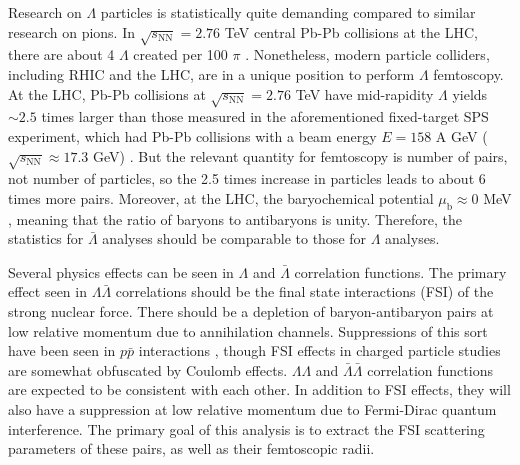 Research on $\Lambda$ particles is statistically quite demanding compared to similar research on pions.
In $\sqrt{s_{\mathrm{NN}}}=2.76$ TeV central Pb-Pb collisions at the LHC, there are about 4 $\Lambda$ created per 100 $\pi$ \cite{Zhang:2013fta}.
Nonetheless, modern particle colliders, including RHIC and the LHC, are in a unique position to perform $\Lambda$ femtoscopy.
At the LHC, Pb-Pb collisions at $\sqrt{s_{\mathrm{NN}}}=2.76$ TeV have mid-rapidity $\Lambda$ yields $\sim 2.5$ times larger than those measured in the aforementioned fixed-target SPS experiment, which had Pb-Pb collisions with a beam energy $E = 158$ A GeV ($\sqrt{s_{\mathrm{NN}}} \approx 17.3$ GeV)  \cite{Abelev:2013xaa,Alt:2008qm}.
But the relevant quantity for femtoscopy is number of pairs, not number of particles, so the 2.5 times increase in particles leads to about 6 times more pairs. 
Moreover, at the LHC, the baryochemical potential $\mu_\mathrm{b} \approx 0$ MeV \cite{Stachel:2013zma}, meaning that the ratio of baryons to antibaryons is unity.
Therefore, the statistics for $\bar{\Lambda}$ analyses should be comparable to those for $\Lambda$ analyses.





Several physics effects can be seen in $\Lambda$ and $\bar{\Lambda}$ correlation functions.
The primary effect seen in $\Lambda\bar{\Lambda}$ correlations should be the final state interactions (FSI) of the strong nuclear force.  
There should be a depletion of baryon-antibaryon pairs at low relative momentum due to annihilation channels.
Suppressions of this sort have been seen in $p \bar{p}$ interactions \cite{Gos:2007cj,Adamczyk:2015hza}, though FSI effects in charged particle studies are somewhat obfuscated by Coulomb effects.  
$\Lambda\Lambda$ and $\bar{\Lambda}\bar{\Lambda}$ correlation functions are expected to be consistent with each other.
In addition to FSI effects, they will also have a suppression at low relative momentum due to Fermi-Dirac quantum interference.
The primary goal of this analysis is to extract the FSI scattering parameters of these pairs, as well as their femtoscopic radii.

